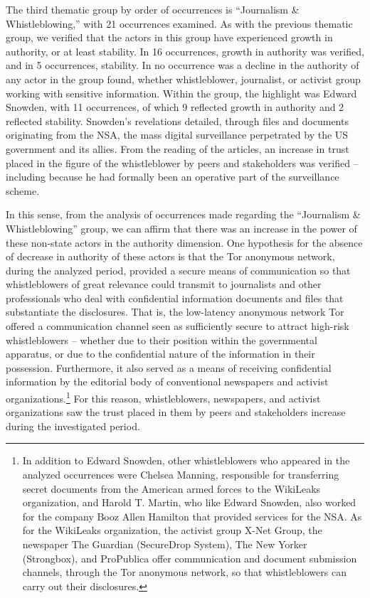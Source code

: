 The third thematic group by order of occurrences is ``Journalism \& Whistleblowing,'' with 21 occurrences examined. As with the previous thematic group, we verified that the actors in this group have experienced growth in authority, or at least stability. In 16 occurrences, growth in authority was verified, and in 5 occurrences, stability. In no occurrence was a decline in the authority of any actor in the group found, whether whistleblower, journalist, or activist group working with sensitive information. Within the group, the highlight was Edward Snowden, with 11 occurrences, of which 9 reflected growth in authority and 2 reflected stability. Snowden's revelations detailed, through files and documents originating from the NSA, the mass digital surveillance perpetrated by the US government and its allies. From the reading of the articles, an increase in trust placed in the figure of the whistleblower by peers and stakeholders was verified -- including because he had formally been an operative part of the surveillance scheme.

In this sense, from the analysis of occurrences made regarding the ``Journalism \& Whistleblowing'' group, we can affirm that there was an increase in the power of these non-state actors in the authority dimension. One hypothesis for the absence of decrease in authority of these actors is that the Tor anonymous network, during the analyzed period, provided a secure means of communication so that whistleblowers of great relevance could transmit to journalists and other professionals who deal with confidential information documents and files that substantiate the disclosures. That is, the low-latency anonymous network Tor offered a communication channel seen as sufficiently secure to attract high-risk whistleblowers -- whether due to their position within the governmental apparatus, or due to the confidential nature of the information in their possession. Furthermore, it also served as a means of receiving confidential information by the editorial body of conventional newspapers and activist organizations.\footnote{In addition to Edward Snowden, other whistleblowers who appeared in the analyzed occurrences were Chelsea Manning, responsible for transferring secret documents from the American armed forces to the WikiLeaks organization, and Harold T. Martin, who like Edward Snowden, also worked for the company Booz Allen Hamilton that provided services for the NSA. As for the WikiLeaks organization, the activist group X-Net Group, the newspaper The Guardian (SecureDrop System), The New Yorker (Strongbox), and ProPublica offer communication and document submission channels, through the Tor anonymous network, so that whistleblowers can carry out their disclosures.} For this reason, whistleblowers, newspapers, and activist organizations saw the trust placed in them by peers and stakeholders increase during the investigated period.

